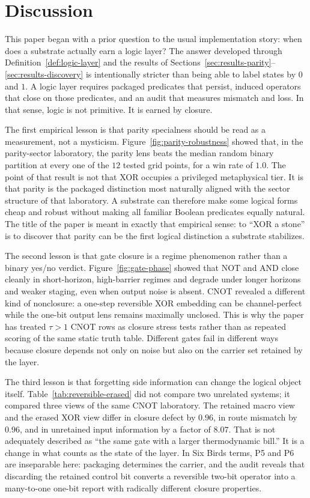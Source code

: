 \documentclass[11pt]{article}
\theoremstyle{definition}
\begin{document}
 \section{Discussion}
\label{sec:discussion}

This paper began with a prior question to the usual implementation story: when does a substrate actually earn a logic layer? The answer developed through Definition~\ref{def:logic-layer} and the results of Sections~\ref{sec:results-parity}--\ref{sec:results-discovery} is intentionally stricter than being able to label states by \(0\) and \(1\). A logic layer requires packaged predicates that persist, induced operators that close on those predicates, and an audit that measures mismatch and loss. In that sense, logic is not primitive. It is earned by closure.

The first empirical lesson is that parity specialness should be read as a measurement, not a mysticism. Figure~\ref{fig:parity-robustness} showed that, in the parity-sector laboratory, the parity lens beats the median random binary partition at every one of the \(12\) tested grid points, for a win rate of \(1.0\). The point of that result is not that XOR occupies a privileged metaphysical tier. It is that parity is the packaged distinction most naturally aligned with the sector structure of that laboratory. A substrate can therefore make some logical forms cheap and robust without making all familiar Boolean predicates equally natural. The title of the paper is meant in exactly that empirical sense: to ``XOR a stone'' is to discover that parity can be the first logical distinction a substrate stabilizes.

The second lesson is that gate closure is a regime phenomenon rather than a binary yes/no verdict. Figure~\ref{fig:gate-phase} showed that NOT and AND close cleanly in short-horizon, high-barrier regimes and degrade under longer horizons and weaker staging, even when output noise is absent. CNOT revealed a different kind of nonclosure: a one-step reversible XOR embedding can be channel-perfect while the one-bit output lens remains maximally unclosed. This is why the paper has treated \(\tau>1\) CNOT rows as closure stress tests rather than as repeated scoring of the same static truth table. Different gates fail in different ways because closure depends not only on noise but also on the carrier set retained by the layer.

The third lesson is that forgetting side information can change the logical object itself. Table~\ref{tab:reversible-erased} did not compare two unrelated systems; it compared three views of the same CNOT laboratory. The retained macro view and the erased XOR view differ in closure defect by \(0.96\), in route mismatch by \(0.96\), and in unretained input information by a factor of \(8.07\). That is not adequately described as ``the same gate with a larger thermodynamic bill.'' It is a change in what counts as the state of the layer. In Six Birds terms, P5 and P6 are inseparable here: packaging determines the carrier, and the audit reveals that discarding the retained control bit converts a reversible two-bit operator into a many-to-one one-bit report with radically different closure properties.
\end{document}
